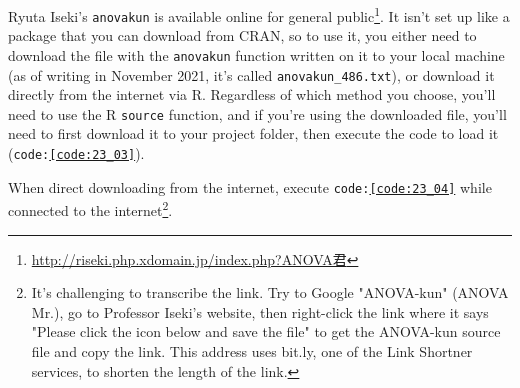 \documentclass{ltjbook}
\begin{document}
Ryuta Iseki's \texttt{anovakun} is available online for general public\footnote{\url{http://riseki.php.xdomain.jp/index.php?ANOVA君}}. It isn't set up like a package that you can download from CRAN, so to use it, you either need to download the file with the \texttt{anovakun} function written on it to your local machine (as of writing in November 2021, it's called \verb|anovakun_486.txt|), or download it directly from the internet via R. Regardless of which method you choose, you'll need to use the R \texttt{source} function, and if you're using the downloaded file, you'll need to first download it to your project folder, then execute the code to load it (\texttt{code:\ref{code:23_03}}).



When direct downloading from the internet, execute \texttt{code:\ref{code:23_04}} while connected to the internet\footnote{It's challenging to transcribe the link. Try to Google "ANOVA-kun" (ANOVA Mr.), go to Professor Iseki's website, then right-click the link where it says "Please click the icon below and save the file" to get the ANOVA-kun source file and copy the link. This address uses bit.ly, one of the Link Shortner services, to shorten the length of the link.}.



\end{document}
